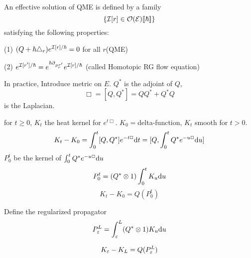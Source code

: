 \begin{definition}
An effective solution of QME is defined by a family
$$\{\mathcal{I}[r]\in\mathcal{O}(\mathcal{E})[\![\hbar]\!]\}$$
satisfying the following properties:

(1) $(Q+\hbar\triangle_r)e^{\mathcal{I}[r]/\hbar}=0$ for all $r$(QME)

(2) $e^{\mathcal{I}[r']/\hbar}=e^{\hbar\partial_{P_r^{r'}}}e^{\mathcal{I}[r]/\hbar}$
(called Homotopic RG flow equation)
\end{definition}

In practice, Introduce metric on $E$. $Q^*$ is the adjoint of $Q$,
$$\Box=[Q,Q^*]=QQ^*+Q^*Q$$
is the Laplacian.

for $t\geq 0$, $K_t$ the heat kernel for $e^{t\Box}$.
$K_0=$delta-function, $K_t$ smooth for $t>0$.
$$K_t-K_0=
\int_0^t[Q,Q^*]e^{-t\Box}\mathrm{d} t
=[Q,\int_0^tQ^*e^{-u\Box}\mathrm{d} u]$$
$P_0^t$ be the kernel of $\int_0^tQ^*e^{-u\Box}\mathrm{d} u$
$$P_0^t=(Q^*\otimes 1)\int_0^tK_u\mathrm{d} u$$
$$K_t-K_0=Q(P_0^t)$$

Define the regularized propagator
$$P_\varepsilon^L=\int_\varepsilon^L(Q^*\otimes 1)K_u\mathrm{d} u$$

$$K_\varepsilon-K_L=Q(P_{\varepsilon}^L)$$









